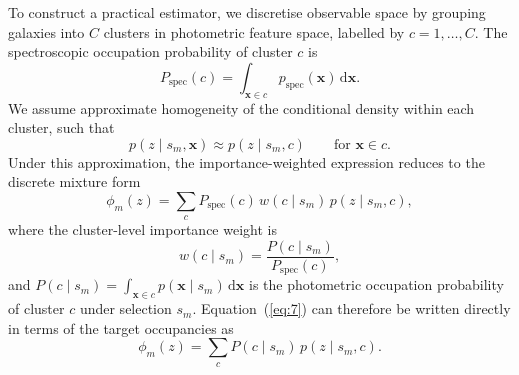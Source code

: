 To construct a practical estimator, we discretise observable space by grouping galaxies into \(C\) clusters in photometric feature space, labelled by \(c = 1, \ldots, C\). The spectroscopic occupation probability of cluster \(c\) is
\begin{equation} \label{eq:5}
    P_\mathrm{spec}(c) = \int_{\mathbf{x}\in c} p_\mathrm{spec}(\mathbf{x}) \, \mathrm{d}\mathbf{x}.
\end{equation}
We assume approximate homogeneity of the conditional density within each cluster, such that
\begin{equation} \label{eq:6}
    p(z \mid s_m, \mathbf{x}) \approx p(z \mid s_m, c)
    \qquad \text{for } \mathbf{x}\in c.
\end{equation}
Under this approximation, the importance-weighted expression reduces to the discrete mixture form
\begin{equation} \label{eq:7}
    \phi_m(z) = \sum_{c} P_\mathrm{spec}(c) \, w(c \mid s_m) \, p(z \mid s_m, c),
\end{equation}
where the cluster-level importance weight is
\begin{equation} \label{eq:8}
    w(c \mid s_m) = \frac{P(c \mid s_m)}{P_\mathrm{spec}(c)},
\end{equation}
and \(P(c \mid s_m) = \int_{\mathbf{x}\in c} p(\mathbf{x}\mid s_m) \, \mathrm{d}\mathbf{x}\) is the photometric occupation probability of cluster \(c\) under selection \(s_m\). Equation~(\ref{eq:7}) can therefore be written directly in terms of the target occupancies as
\begin{equation} \label{eq:9}
    \phi_m(z) = \sum_{c} P(c \mid s_m) \, p(z \mid s_m, c).
\end{equation}

